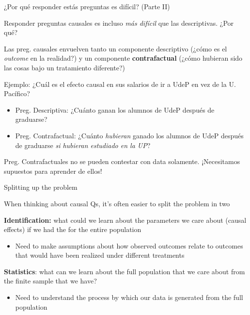 \documentclass[11pt,handout,aspectratio=169]{beamer}
\newenvironment{wideitemize}{\itemize\addtolength{\itemsep}{10pt}}{\enditemize}
\begin{document}
\begin{frame}{¿Por qué responder estás preguntas es difícil? (Parte II)}
\begin{wideitemize}
	\item
	Responder preguntas causales es incluso \textit{más difícil} que las descriptivas. ¿Por qué?
	
	\pause
	\item
	Las preg. causales envuelven tanto un componente descriptivo (¿cómo es el \textit{outcome} en la realidad?) y un componente \textbf{contrafactual} (¿cómo hubieran sido las cosas bajo un tratamiento diferente?)
	
	\pause
	\item
	Ejemplo: ¿Cuál es el efecto causal en sus salarios de ir a UdeP en vez de la U. Pacífico?
		\begin{itemize}
			\item
			Preg. Descriptiva: ¿Cuánto ganan los alumnos de UdeP después de graduarse?
			
			\item
			Preg. Contrafactual: ¿Cuánto \textit{hubieran} ganado los alumnos de UdeP después de graduarse \textit{si hubieran estudiado en la UP}?
		\end{itemize}
		
	\pause 	
	\item Preg. Contrafactuales no se pueden contestar con data solamente. ¡Necesitamos supuestos para aprender de ellos!
	
\end{wideitemize}	
\end{frame}



\begin{frame}{Splitting up the problem}
	\begin{wideitemize}
		
		\item
		When thinking about causal Qs, it's often easier to split the problem in two
		
		\item
		\textbf{Identification:} what could we learn about the parameters we care about (causal effects) if we had the  for the entire population
		\begin{itemize}
			\item 
			Need to make assumptions about how observed outcomes relate to outcomes that would have been realized under different treatments
		\end{itemize}
		
		\item
		\textbf{Statistics}: what can we learn about the full population that we care about from the finite sample that we have?
			\begin{itemize}
				\item 
				Need to understand the process by which our data is generated from the full population
			\end{itemize} 	
		
	\end{wideitemize}	
	
\end{frame}
\end{document}

